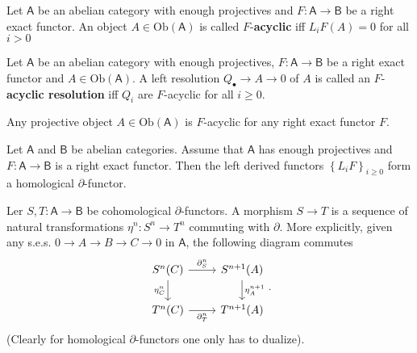 \begin{defn}
	Let $\mathsf{A}$ be an abelian category with enough projectives
	and $F: \mathsf{A} \to \mathsf{B}$ be a right exact functor.
	An object $A \in \mathrm{Ob} \left(\mathsf{A}\right)$ is called
	$F$-\textbf{acyclic} iff $L_iF(A) = 0$ for all $i > 0$
\end{defn}

\begin{defn}
	Let $\mathsf{A}$ be an abelian category with enough projectives,
	$F: \mathsf{A} \to \mathsf{B}$ be a right exact functor and $A \in \mathrm{Ob} \left(\mathsf{A}\right)$.
	A left resolution $Q_{\bullet} \to A \to 0$ of $A$ is called an
	$F$-\textbf{acyclic resolution} iff $Q_i$ are $F$-acyclic
	for all $i \geq 0$.	
\end{defn}

\begin{rem}[]
	Any projective object $A \in \mathrm{Ob} \left(\mathsf{A}\right)$ is $F$-acyclic
	for any right exact functor $F$.
\end{rem}

\begin{thm}[]
	Let $\mathsf{A}$ and $\mathsf{B}$ be abelian categories.
	Assume that $\mathsf{A}$ has enough projectives and $F: \mathsf{A} \to \mathsf{B}$
	is a right exact functor.
	Then the left derived functors $\left\{ L_i F \right\}_{i \geq 0}$
	form a homological $\partial$-functor.
\end{thm}

\begin{defn}
	Ler $S,T: \mathsf{A} \to \mathsf{B}$ be cohomological $\partial$-functors.
	A morphism $S \to T$ is a sequence of natural transformations
	$\eta^n: S^n \to T^n$ commuting with $\partial$.
	More explicitly, given any s.e.s. $0 \to A \to B \to C \to 0$ in $\mathsf{A}$,
	the following diagram commutes
	\begin{equation}
	\begin{tikzcd}
		S^n(C) \arrow[r, "\partial^n_S", rightarrow] \arrow[d, "\eta^n_C"', rightarrow] &
		S^{n+1}(A) \arrow[d, "\eta^{n+1}_A", rightarrow] \\
		T^n(C) \arrow[r, "\partial^n_T"', rightarrow] &
		T^{n+1}(A)
	\end{tikzcd}
	.\end{equation} 
	(Clearly for homological $\partial$-functors one only has to dualize).
\end{defn}

